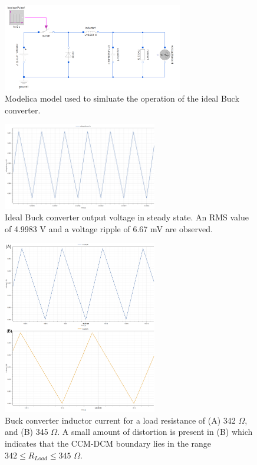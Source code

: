 \documentclass[12pt,twoside]{scrartcl}
\begin{document}
\begin{figure}[h]
    \centering
    \includegraphics[width=0.7\textwidth]{Buck_idealModel}
    \caption{Modelica model used to simluate the operation of the ideal Buck converter.}
    \label{fig:Buck_idealModel}
\end{figure}

\begin{figure}[h]
    \centering
    \includegraphics[width=0.6\textwidth]{Buck_idealVout}
    \caption{Ideal Buck converter output voltage in steady state. An RMS value of 4.9983 V and a voltage ripple of 6.67 mV are observed.}
    \label{fig:Buck_idealVout}
\end{figure}

\begin{figure}[h!]
    \centering
    \includegraphics[width=0.6\textwidth]{buck_DCM}
    \caption{Buck converter inductor current for a load resistance of (A) 342 $\Omega$, and (B) 345 $\Omega$. A small amount of distortion is present in (B) which indicates that the CCM-DCM boundary lies in the range $342 \le R_{Load} \le 345$ $\Omega$.}
    \label{fig:buck_DCM}
\end{figure}
\newpage
\end{document}
